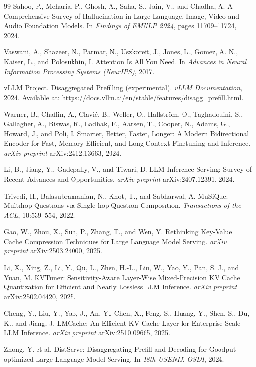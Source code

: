 \documentclass[12pt,a4paper]{article}
\begin{document}
\begin{thebibliography}{99}
Sahoo, P., Meharia, P., Ghosh, A., Saha, S., Jain, V., and Chadha, A. A Comprehensive Survey of Hallucination in Large Language, Image, Video and Audio Foundation Models. In \textit{Findings of EMNLP 2024}, pages 11709--11724, 2024.

Vaswani, A., Shazeer, N., Parmar, N., Uszkoreit, J., Jones, L., Gomez, A. N., Kaiser, Ł., and Polosukhin, I. Attention Is All You Need. In \textit{Advances in Neural Information Processing Systems (NeurIPS)}, 2017.

vLLM Project. Disaggregated Prefilling (experimental). \textit{vLLM Documentation}, 2024. Available at: \url{https://docs.vllm.ai/en/stable/features/disagg_prefill.html}.

Warner, B., Chaffin, A., Clavié, B., Weller, O., Hallström, O., Taghadouini, S., Gallagher, A., Biswas, R., Ladhak, F., Aarsen, T., Cooper, N., Adams, G., Howard, J., and Poli, I. Smarter, Better, Faster, Longer: A Modern Bidirectional Encoder for Fast, Memory Efficient, and Long Context Finetuning and Inference. \textit{arXiv preprint} arXiv:2412.13663, 2024.

Li, B., Jiang, Y., Gadepally, V., and Tiwari, D. LLM Inference Serving: Survey of Recent Advances and Opportunities. \textit{arXiv preprint} arXiv:2407.12391, 2024.

Trivedi, H., Balasubramanian, N., Khot, T., and Sabharwal, A. MuSiQue: Multihop Questions via Single-hop Question Composition. \textit{Transactions of the ACL}, 10:539--554, 2022.

Gao, W., Zhou, X., Sun, P., Zhang, T., and Wen, Y. Rethinking Key-Value Cache Compression Techniques for Large Language Model Serving. \textit{arXiv preprint} arXiv:2503.24000, 2025.

Li, X., Xing, Z., Li, Y., Qu, L., Zhen, H.-L., Liu, W., Yao, Y., Pan, S. J., and Yuan, M. KVTuner: Sensitivity-Aware Layer-Wise Mixed-Precision KV Cache Quantization for Efficient and Nearly Lossless LLM Inference. \textit{arXiv preprint} arXiv:2502.04420, 2025.

Cheng, Y., Liu, Y., Yao, J., An, Y., Chen, X., Feng, S., Huang, Y., Shen, S., Du, K., and Jiang, J. LMCache: An Efficient KV Cache Layer for Enterprise-Scale LLM Inference. \textit{arXiv preprint} arXiv:2510.09665, 2025.

Zhong, Y. et al. DistServe: Disaggregating Prefill and Decoding for Goodput-optimized Large Language Model Serving. In \textit{18th USENIX OSDI}, 2024.

\end{thebibliography}
\end{document}

